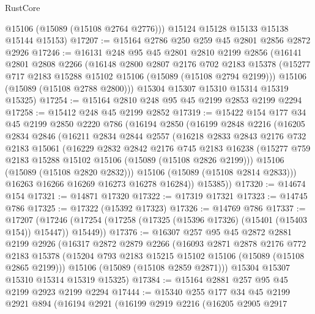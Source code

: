 \begin{lexlean}{RustCore}
\begin{coremodule}
        @15106
        (@15089 (@15108 @2764 @2776)))
      @15124
      @15128
      @15133
      @15138
      @15144
      @15153)
@17207 := @15164 @2786 @250 @259 @45 @2801 @2856 @2872 @2926
@17246 := @16131
    @248
    @95
    @45
    @2801
    @2810
    @2199
    @2856
    (@16141
      @2801
      @2808
      @2266
      (@16148
        @2800
        @2807
        @2176
        @702
        @2183
        @15378
        (@15277 @717 @2183 @15288 @15102 @15106 (@15089 (@15108 @2794 @2199)))
        @15106
        (@15089 (@15108 @2788 @2800)))
      @15304
      @15307
      @15310
      @15314
      @15319
      @15325)
@17254 := @15164 @2810 @248 @95 @45 @2199 @2853 @2199 @2294
@17258 := @15412 @248 @45 @2199 @2852
@17319 := @15422
    @154
    @177
    @34
    @45
    @2199
    @2850
    @2220
    @786
    (@16194
      @2850
      (@16199
        @2848
        @2216
        (@16205
          @2834
          @2846
          (@16211
            @2834
            @2844
            @2557
            (@16218
              @2833
              @2843
              @2176
              @732
              @2183
              @15061
              (@16229
                @2832
                @2842
                @2176
                @745
                @2183
                @16238
                (@15277 @759 @2183 @15288 @15102 @15106 (@15089 (@15108 @2826 @2199)))
                @15106
                (@15089 (@15108 @2820 @2832)))
              @15106
              (@15089 (@15108 @2814 @2833)))
            @16263
            @16266
            @16269
            @16273
            @16278
            @16284))
        @15385))
@17320 := @14674 @154
@17321 := @14871 @17320
@17322 := @17319 @17321
@17323 := @14745 @786
@17325 := @17322 (@15392 @17323)
@17326 := @14769 @786
@17337 := @17207
    (@17246 (@17254 (@17258 (@17325 (@15396 @17326) (@15401 (@15403 @154)) @15447)) @15449))
@17376 := @16307
    @257
    @95
    @45
    @2872
    @2881
    @2199
    @2926
    (@16317
      @2872
      @2879
      @2266
      (@16093
        @2871
        @2878
        @2176
        @772
        @2183
        @15378
        (@15204 @793 @2183 @15215 @15102 @15106 (@15089 (@15108 @2865 @2199)))
        @15106
        (@15089 (@15108 @2859 @2871)))
      @15304
      @15307
      @15310
      @15314
      @15319
      @15325)
@17384 := @15164 @2881 @257 @95 @45 @2199 @2923 @2199 @2294
@17444 := @15340
    @255
    @177
    @34
    @45
    @2199
    @2921
    @894
    (@16194
      @2921
      (@16199
        @2919
        @2216
        (@16205
          @2905
          @2917

\end{coremodule}
\end{lexlean}
